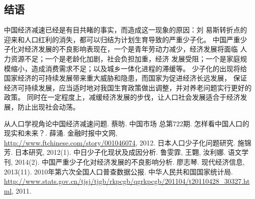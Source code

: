 \documentclass[cs5size,b5paper,nofonts]{ctexart}
\begin{document}
\begin{multicols}{2}
\section{结语}

中国经济减速已经是有目共睹的事实，而造成这一现象的原因：刘
易斯转折点的迎来和人口红利的消失，都可以归结为计划生育导致的严重少子化。
中国严重少子化对经济发展的不良影响表现在，一个是青年劳动力减少，经济发展将面临
人力资源不足；一个是老龄化加剧，社会负担加重，经济
发展受阻；一个是家庭规模缩小，造成消费需求不足；以及城乡一体化进程的滞缓等。
少子化的出现将给国家经济的可持续发展带来重大威胁和隐患，而国家为促进经济长远发展，
保证经济可持续发展，应当适时地对我国生育政策做出调整，并对养老问题实行更好的政策。
同时在一定程度上，减缓经济发展的步伐，让人口社会发展适合于经济发展，防止出现社会动荡。

\begin{thebibliography}{10}
 从人口学视角论中国经济减速问题. 蔡昉. 中国市场 总第722期.
 怎样看中国人口的现实和未来？. 薛涌. 金融时报中文网, \url{http://www.ftchinese.com/story/001046074}, 2012.
 日本人口少子化问题研究. 施锦芳. 日本研究, 2012(1).
 中日少子化现状及成因分析. 鲁雯霏, 王翾, 汝利娜. 语文学刊, 2014(2).
 中国严重少子化对经济发展的不良影响分析. 廖志琴. 现代经济信息, 2013(11).
 2010年第六次全国人口普查数据公报. 中华人民共和国国家统计局. \url{http://www.stats.gov.cn/tjsj/tjgb/rkpcgb/qgrkpcgb/201104/t20110428_30327.html}, 2011.
\end{thebibliography}

\end{multicols}
\end{document}
